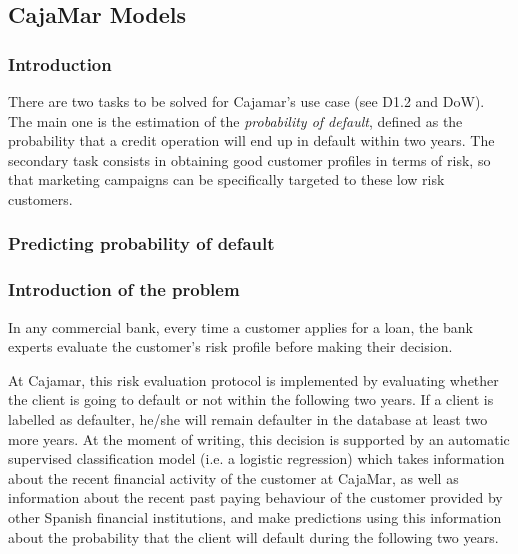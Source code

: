 

\subsection{CajaMar Models}
\label{Section:CajaMarModels}

\subsubsection{Introduction}

There are two tasks to be solved for Cajamar's use case (see D1.2 and DoW). The main one is
the estimation of the \emph{probability of default}, defined as the probability that a
credit operation will end up in default within two years. The secondary task consists in obtaining 
good customer profiles in terms of risk, so that marketing campaigns can be
specifically targeted to these low risk customers. 

\subsubsection{Predicting probability of default}
\label{SubSection:Predicting}

\subsubsection*{Introduction of the problem} 

In any commercial bank, every time a customer applies for a loan, the bank experts evaluate the customer's risk profile before making their decision. 

At Cajamar, this risk evaluation protocol is implemented by evaluating whether the client is going to default or not within the following two years. If a client is labelled as defaulter, he/she will remain defaulter in the database at least two more years. At the moment of writing, this decision is supported by an automatic supervised classification model (i.e. a logistic regression) which takes information about the recent financial activity of the customer at CajaMar, as well as information about the recent past paying behaviour of the customer provided by other Spanish financial institutions, and make predictions using this information about the probability that the client will default during the following two years.

